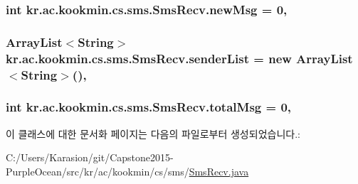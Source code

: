 \subsubsection[{new\+Msg}]{\setlength{\rightskip}{0pt plus 5cm}int kr.\+ac.\+kookmin.\+cs.\+sms.\+Sms\+Recv.\+new\+Msg = 0\hspace{0.3cm}{\ttfamily [static]}, {\ttfamily [private]}}\label{classkr_1_1ac_1_1kookmin_1_1cs_1_1sms_1_1_sms_recv_aaf779b19a6535e13097318be45a1da55}
\hypertarget{classkr_1_1ac_1_1kookmin_1_1cs_1_1sms_1_1_sms_recv_a486abb44de1e3587a26c1c05d4eb96a8}{}
\subsubsection[{sender\+List}]{\setlength{\rightskip}{0pt plus 5cm}Array\+List$<$String$>$ kr.\+ac.\+kookmin.\+cs.\+sms.\+Sms\+Recv.\+sender\+List = new Array\+List$<$String$>$()\hspace{0.3cm}{\ttfamily [static]}, {\ttfamily [private]}}\label{classkr_1_1ac_1_1kookmin_1_1cs_1_1sms_1_1_sms_recv_a486abb44de1e3587a26c1c05d4eb96a8}
\hypertarget{classkr_1_1ac_1_1kookmin_1_1cs_1_1sms_1_1_sms_recv_a6463fdd6154cad89cd16cac0e0ffc1c1}{}
\subsubsection[{total\+Msg}]{\setlength{\rightskip}{0pt plus 5cm}int kr.\+ac.\+kookmin.\+cs.\+sms.\+Sms\+Recv.\+total\+Msg = 0\hspace{0.3cm}{\ttfamily [static]}, {\ttfamily [private]}}\label{classkr_1_1ac_1_1kookmin_1_1cs_1_1sms_1_1_sms_recv_a6463fdd6154cad89cd16cac0e0ffc1c1}


이 클래스에 대한 문서화 페이지는 다음의 파일로부터 생성되었습니다.\+:\begin{DoxyCompactItemize}
\item 
C\+:/\+Users/\+Karasion/git/\+Capstone2015-\/\+Purple\+Ocean/src/kr/ac/kookmin/cs/sms/\hyperlink{_sms_recv_8java}{Sms\+Recv.\+java}\end{DoxyCompactItemize}
